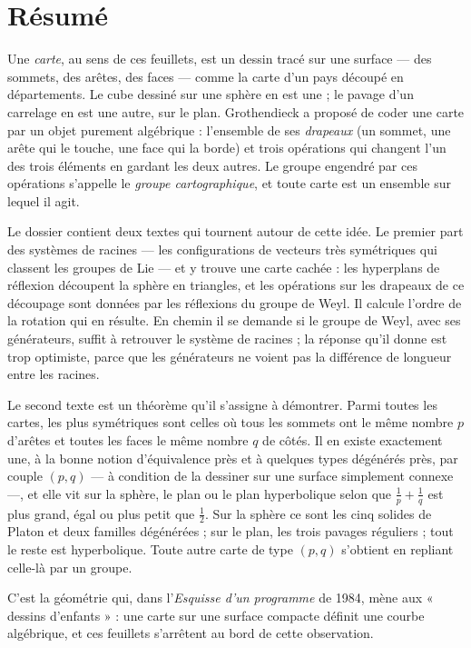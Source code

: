 \documentclass[11pt,a4paper]{article}
\begin{document}
\section*{Résumé}

\begin{resume}
Une \emph{carte}, au sens de ces feuillets, est un dessin tracé sur une
surface --- des sommets, des arêtes, des faces --- comme la carte d'un pays
découpé en départements. Le cube dessiné sur une sphère en est une ; le pavage
d'un carrelage en est une autre, sur le plan. Grothendieck a proposé de coder
une carte par un objet purement algébrique : l'ensemble de ses \emph{drapeaux}
(un sommet, une arête qui le touche, une face qui la borde) et trois
opérations qui changent l'un des trois éléments en gardant les deux autres. Le
groupe engendré par ces opérations s'appelle le \emph{groupe cartographique},
et toute carte est un ensemble sur lequel il agit.

Le dossier contient deux textes qui tournent autour de cette idée. Le premier
part des systèmes de racines --- les configurations de vecteurs très
symétriques qui classent les groupes de Lie --- et y trouve une carte cachée :
les hyperplans de réflexion découpent la sphère en triangles, et les
opérations sur les drapeaux de ce découpage sont données par les réflexions du
groupe de Weyl. Il calcule l'ordre de la rotation qui en résulte. En chemin il
se demande si le groupe de Weyl, avec ses générateurs, suffit à retrouver le
système de racines ; la réponse qu'il donne est trop optimiste, parce que les
générateurs ne voient pas la différence de longueur entre les racines.

Le second texte est un théorème qu'il s'assigne à démontrer. Parmi toutes les
cartes, les plus symétriques sont celles où tous les sommets ont le même
nombre $p$ d'arêtes et toutes les faces le même nombre $q$ de côtés. Il en
existe exactement une, à la bonne notion d'équivalence près et à quelques
types dégénérés près, par couple $(p, q)$ --- à condition de la dessiner sur une surface simplement connexe ---,
et elle vit sur la sphère, le plan ou le plan hyperbolique selon que
$\frac{1}{p} + \frac{1}{q}$ est plus grand, égal ou plus petit que
$\frac{1}{2}$. Sur la sphère ce sont les cinq solides de Platon et deux
familles dégénérées ; sur le plan, les trois pavages réguliers ; tout le reste
est hyperbolique. Toute autre carte de type $(p,q)$ s'obtient en repliant
celle-là par un groupe.

C'est la géométrie qui, dans l'\emph{Esquisse d'un programme} de 1984, mène aux
« dessins d'enfants » : une carte sur une surface compacte définit une courbe
algébrique, et ces feuillets s'arrêtent au bord de cette observation.

\end{resume}
\end{document}
